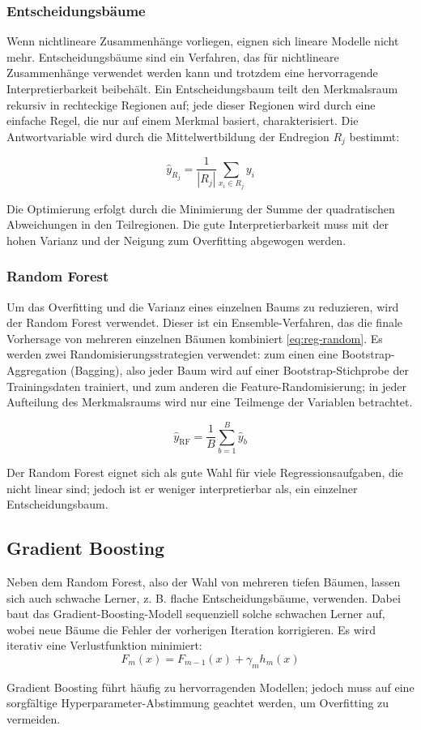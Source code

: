 \subsubsection{Entscheidungsbäume}

Wenn nichtlineare Zusammenhänge vorliegen, eignen sich lineare Modelle nicht mehr. Entscheidungsbäume sind ein Verfahren, das für nichtlineare Zusammenhänge verwendet werden kann und trotzdem eine hervorragende Interpretierbarkeit beibehält. Ein Entscheidungsbaum teilt den Merkmalsraum rekursiv in rechteckige Regionen auf; jede dieser Regionen wird durch eine einfache Regel, die nur auf einem Merkmal basiert, charakterisiert. Die Antwortvariable wird durch die Mittelwertbildung der Endregion \(R_j\) bestimmt:

\begin{equation}
\hat{y}_{R_j} = \frac{1}{|R_j|} \sum_{x_i \in R_j} y_i
\label{eq:reg-tree}
\end{equation}

Die Optimierung erfolgt durch die Minimierung der Summe der quadratischen Abweichungen in den Teilregionen. Die gute Interpretierbarkeit muss mit der hohen Varianz und der Neigung zum Overfitting abgewogen werden. \cite{Hastie2009}

\subsubsection{Random Forest}
Um das Overfitting und die Varianz eines einzelnen Baums zu reduzieren, wird der Random Forest verwendet. Dieser ist ein Ensemble-Verfahren, das die finale Vorhersage von mehreren einzelnen Bäumen kombiniert \ref{eq:reg-random}. Es werden zwei Randomisierungsstrategien verwendet: zum einen eine Bootstrap-Aggregation (Bagging), also jeder Baum wird auf einer Bootstrap-Stichprobe der Trainingsdaten trainiert, und zum anderen die Feature-Randomisierung; in jeder Aufteilung des Merkmalsraums wird nur eine Teilmenge der Variablen betrachtet. 

\begin{equation}
  \hat{y}_{\text{RF}} = \frac{1}{B} \sum_{b=1}^{B} \hat{y}_b
  \label{eq:reg-random}
\end{equation}

Der Random Forest eignet sich als gute Wahl für viele Regressionsaufgaben, die nicht linear sind; jedoch ist er weniger interpretierbar als, ein einzelner Entscheidungsbaum. \cite{Hastie2009}

\subsection{Gradient Boosting}
Neben dem Random Forest, also der Wahl von mehreren tiefen Bäumen, lassen sich auch schwache Lerner, z. B. flache Entscheidungsbäume, verwenden. Dabei baut das Gradient-Boosting-Modell sequenziell solche schwachen Lerner auf, wobei neue Bäume die Fehler der vorherigen Iteration korrigieren. Es wird iterativ eine Verlustfunktion minimiert:
\begin{equation}
  F_m(x) = F_{m-1}(x) + \gamma_m h_m(x)
  \label{eq:reg-grad}
\end{equation}

Gradient Boosting führt häufig zu hervorragenden Modellen; jedoch muss auf eine sorgfältige Hyperparameter-Abstimmung geachtet werden, um Overfitting zu vermeiden. \cite{Hastie2009}
